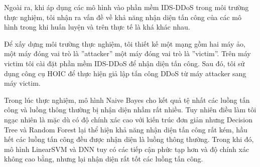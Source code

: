 Ngoài ra, khi áp dụng các mô hình vào phần mềm IDS-DDoS trong môi trường thực nghiệm, tôi nhận ra vấn đề về khả năng nhận diện tấn công của các mô hình trong khi huấn luyện và trên thực tế là khá khác nhau.

Để xấy dựng môi trường thực nghiệm, tôi thiết kế một mạng gồm hai máy ảo, một máy đóng vai trò là ''attacker'' một máy đóng vai trò là ''victim''. Trên máy victim tôi cài đặt phần mềm IDS-DDoS để nhận diện tấn công. Sau đó, tôi sử dụng công cụ HOIC để thực hiện giả lập tấn công DDoS từ máy attacker sang máy victim. 

Trong lúc thực nghiệm, mô hình Naive Bayes cho kết quả tệ nhất các luồng tấn công và luồng thông thường bị nhận diện nhầm rất nhiều. Tuy nhiên điều làm tôi ngạc nhiên là mặc dù có độ chính xác cao với kiến trúc đơn giản nhưng Decision Tree và Random Forest lại thể hiện khả năng nhận diện tấn công rất kém, hầu hết các luồng tấn công đều được nhận diện là luồng thông thường. Trong khi đó, mô hình LinearSVM và DNN tuy có các tiếp cận phức tạp hơn và độ chính xác không cao bằng, nhưng lại nhận diện rất tốt các luồng tấn công.

